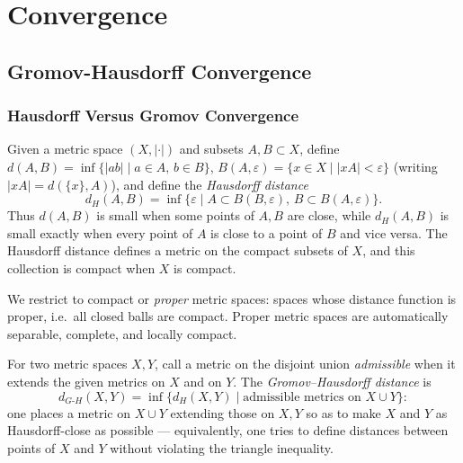 \chapter{Convergence}
\label{chap:pet-convergence}

\newcommand{\Ric}{\operatorname{Ric}}
\newcommand{\Hess}{\operatorname{Hess}}
\newcommand{\vol}{\operatorname{vol}}
\newcommand{\diam}{\operatorname{diam}}
\newcommand{\inj}{\operatorname{inj}}
\newcommand{\sec}{\operatorname{sec}}
\newcommand{\Cap}{\operatorname{Cap}}
\newcommand{\Cov}{\operatorname{Cov}}
\newcommand{\dGH}{d_{G\text{-}H}}

\section{Gromov-Hausdorff Convergence}

\subsection{Hausdorff Versus Gromov Convergence}

\begin{definition}
  \label{def:pet-ch11-hausdorff-distance}
  Given a metric space $(X,|\cdot|)$ and subsets $A,B\subset X$, define
  $d(A,B)=\inf\{|ab|\mid a\in A,\,b\in B\}$,
  $B(A,\varepsilon)=\{x\in X\mid|xA|<\varepsilon\}$ (writing $|xA|=d(\{x\},A)$),
  and define the \emph{Hausdorff distance}
  \[
    d_H(A,B)=\inf\{\varepsilon\mid A\subset B(B,\varepsilon),\,B\subset B(A,\varepsilon)\}.
  \]
  Thus $d(A,B)$ is small when some points of $A,B$ are close, while
  $d_H(A,B)$ is small exactly when every point of $A$ is close to a point of
  $B$ and vice versa. The Hausdorff distance defines a metric on the compact
  subsets of $X$, and this collection is compact when $X$ is compact.
\end{definition}

\begin{convention}
  \label{conv:pet-ch11-compact-proper-spaces}
  We restrict to compact or \emph{proper} metric spaces:
  spaces whose distance function is proper, i.e.\ all closed balls are
  compact. Proper metric spaces are automatically separable, complete, and
  locally compact.
\end{convention}

\begin{definition}
  \label{def:pet-ch11-gromov-hausdorff-distance}
  For two metric spaces $X,Y$, call a metric on the disjoint union
  \emph{admissible} when it extends the given metrics on $X$ and on $Y$. The
  \emph{Gromov--Hausdorff distance} is
  \[
    \dGH(X,Y)=\inf\{d_H(X,Y)\mid\text{admissible metrics on }X\cup Y\}:
  \]
  one places a metric on $X\cup Y$ extending those on $X,Y$ so as to make $X$
  and $Y$ as Hausdorff-close as possible — equivalently, one tries to define
  distances between points of $X$ and $Y$ without violating the triangle
  inequality.
\end{definition}

